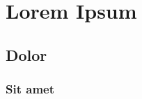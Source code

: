 \chapter{Lorem Ipsum}\label{ch:lorem-ipsum}

\lipsum[1]

\section{Dolor}\label{sec:dolor2}

    \lipsum[2-4]

    \subsection{Sit amet}\label{subsec:sit-amet}

        \lipsum[5-12]